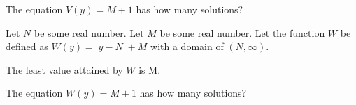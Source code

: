 \documentclass{ximera}
\begin{document}
\begin{exercise}
The equation $V(y) = M+1$ has how many solutions?

\begin{selectAll}
\end{selectAll}

\end{exercise}







\begin{definition}
Let $N$ be some real number.
Let $M$ be some real number.
Let the function $W$ be defined as $W(y) = |y-N|+M$ with a domain of $(N, \infty)$. 

\end{definition}



\begin{exercise}
The least value attained by $W$ is M.

\begin{multipleChoice}
\end{multipleChoice}

\end{exercise}



\begin{exercise}
The equation $W(y) = M+1$ has how many solutions?

\begin{selectAll}
\end{selectAll}

\end{exercise}
\end{document}
